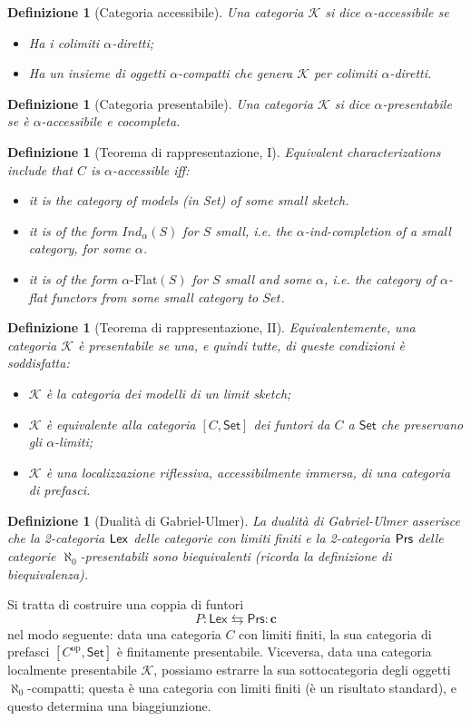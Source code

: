 \documentclass[11pt]{article}
\def\Set{\mathsf{Set}}
\def\opp{\mathrm{op}}
\theoremstyle{reference}
\newtheorem{definition}[theorem]{Definizione}
\begin{document}
\begin{definition}[Categoria accessibile]
Una categoria $\mathcal K$ si dice $\alpha$\hyp{}accessibile se 
\begin{itemize}
\item Ha i colimiti $\alpha$\hyp{}diretti;
\item Ha un insieme di oggetti $\alpha$\hyp{}compatti che genera $\mathcal K$ per colimiti $\alpha$\hyp{}diretti.
\end{itemize}
\end{definition}
\begin{definition}[Categoria presentabile]
Una categoria $\mathcal K$ si dice $\alpha$\hyp{}presentabile se è $\alpha$\hyp{}accessibile e cocompleta.
\end{definition}
\begin{definition}[Teorema di rappresentazione, I]
Equivalent characterizations include that $C$ is $\alpha$\hyp{}accessible iff:
\begin{itemize}
\item it is the category of models (in Set) of some small sketch.
\item it is of the form $Ind_\alpha(S)$ for $S$ small, i.e. the $\alpha$\hyp{}ind-completion of a small category, for some $\alpha$.
\item it is of the form $\alpha\text{-Flat}(S)$ for $S$ small and some $\alpha$, i.e. the category of $\alpha$\hyp{}flat functors from some small category to $Set$.
\end{itemize}
\end{definition}
\begin{definition}[Teorema di rappresentazione, II]
Equivalentemente, una categoria $\mathcal K$ è presentabile se una, e quindi tutte, di queste condizioni è soddisfatta:
\begin{itemize}
\item $\mathcal K$ è la categoria dei modelli di un limit sketch;
\item $\mathcal K$ è equivalente alla categoria $[C,\Set]$ dei funtori da $C$ a $\Set$ che preservano gli $\alpha$\hyp{}limiti;
\item $\mathcal K$ è una localizzazione riflessiva, accessibilmente immersa, di una categoria di prefasci.
\end{itemize}
\end{definition}
\begin{definition}[Dualità di Gabriel-Ulmer]
La dualità di Gabriel-Ulmer asserisce che la 2-categoria
$\sf Lex$ delle categorie con limiti finiti e la 2-categoria
$\sf Prs$ delle categorie $\aleph_0$\hyp{}presentabili sono
biequivalenti (ricorda la definizione di biequivalenza).
\end{definition}
Si tratta di costruire una coppia di funtori
$$
P : \mathsf{Lex} \leftrightarrows \mathsf{Prs} : \mathbf{c}
$$
nel modo seguente: data una categoria \(C\) con limiti finiti,
la sua categoria di prefasci \([C^\opp,\Set]\) è finitamente
presentabile. Viceversa, data una categoria localmente
presentabile \(\mathcal K\), possiamo estrarre la sua
sottocategoria degli oggetti \(\aleph_{\text{0}}\)-compatti; questa è una
categoria con limiti finiti (è un risultato standard), e
questo determina una biaggiunzione.
\end{document}
